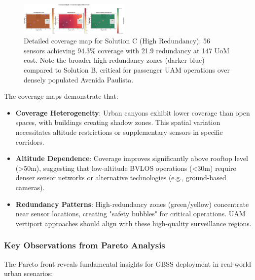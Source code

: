 \begin{figure}[t]
  \centering
  \includegraphics[width=0.48\textwidth]{figures/pareto_map_C_High_Coverage.png}
  \caption{Detailed coverage map for Solution C (High Redundancy): 56 sensors achieving 94.3\% coverage with 21.9 redundancy at 147 UoM cost. Note the broader high-redundancy zones (darker blue) compared to Solution B, critical for passenger UAM operations over densely populated Avenida Paulista.}
  \label{fig:map_high_red}
\end{figure}

The coverage maps demonstrate that:

\begin{itemize}
\item \textbf{Coverage Heterogeneity}: Urban canyons exhibit lower coverage than open spaces, with buildings creating shadow zones. This spatial variation necessitates altitude restrictions or supplementary sensors in specific corridors.

\item \textbf{Altitude Dependence}: Coverage improves significantly above rooftop level (>50m), suggesting that low-altitude BVLOS operations (<30m) require denser sensor networks or alternative technologies (e.g., ground-based cameras).

\item \textbf{Redundancy Patterns}: High-redundancy zones (green/yellow) concentrate near sensor locations, creating "safety bubbles" for critical operations. UAM vertiport approaches should align with these high-quality surveillance regions.
\end{itemize}

\subsubsection{Key Observations from Pareto Analysis}

The Pareto front reveals fundamental insights for GBSS deployment in real-world urban scenarios:

